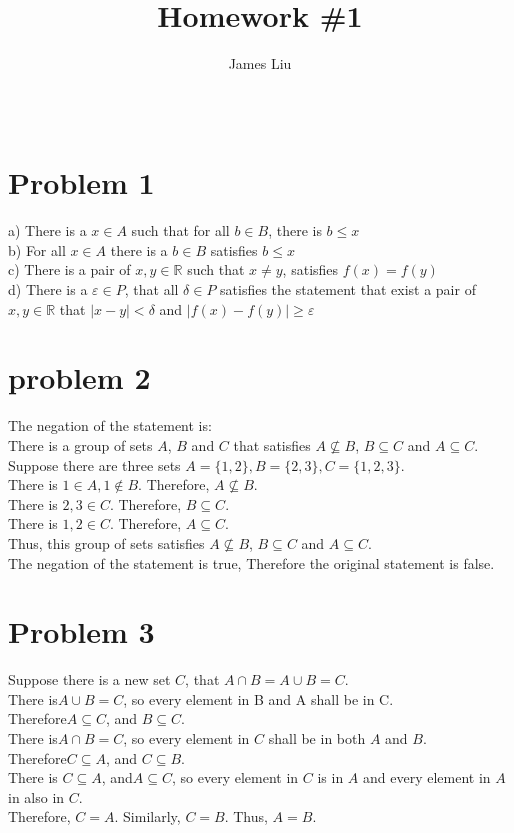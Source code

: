 \documentclass{article}
\begin{document}
\title{\textbf{Homework \#1 }}
\author{James Liu}
\date{\ }
\maketitle

\section*{Problem 1}
    
    a) There is a \(x\in A\) such that for all \(b \in B\), there is \(b \le x\)\\
    b) For all \(x \in A\) there is a \(b\in B\) satisfies \(b \le x\)\\
    c) There is a pair of \(x,y \in \mathbb{R}\) such that \(x\neq y\), satisfies \(f(x)=f(y)\)\\
    d) There is a \(\varepsilon \in P\), that all \(\delta \in P\) satisfies the
    statement that exist a pair of \(x,y \in \mathbb{R}\) that \(|x-y| < \delta\) and \(|f(x)-f(y)|\geq \varepsilon\)
\section*{problem 2}
    The negation of the statement is: \\
    There is a group of sets \(A\), \(B\) and \(C\) that satisfies \(A\nsubseteq B\), \(B \subseteq C\) and \(A \subseteq C\).
    Suppose there are three sets \(A=\{1,2\}, B=\{2,3\},C=\{1,2,3\}\). \\ 
    There is \(1 \in A, 1\notin B\). Therefore, \(A \nsubseteq B\).\\
    There is \(2,3 \in C\). Therefore, \(B \subseteq C\).\\
    There is \(1,2 \in C\). Therefore, \(A \subseteq C\).\\
    Thus, this group of sets satisfies \(A\nsubseteq B\), \(B \subseteq C\) and \(A \subseteq C\).\\
    The negation of the statement is true, Therefore the original statement is false.
\section*{Problem 3}
    Suppose there is a new set \(C\), that \(A\cap B = A\cup B = C\).\\
    There is\(A\cup B =C\), so every element in B and A shall be in C. \\
    Therefore\(A\subseteq C\), and \(B \subseteq C\).\\
    There is\(A\cap B =C\), so every element in \(C\) shall be in both \(A\) and \(B\).\\
    Therefore\(C\subseteq A\), and \(C \subseteq B\).\\
    There is \(C\subseteq A\), and\(A \subseteq C\), so every element in \(C\) is in \(A\) and every element in \(A\) in also in \(C\).\\
    Therefore, \(C = A\). Similarly, \(C = B\). Thus, \(A=B\).
\end{document}
